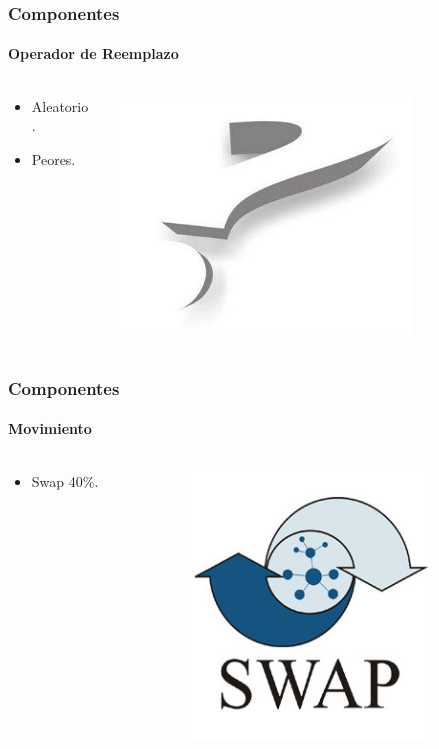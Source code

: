 \frame
{
\frametitle{Componentes}
\framesubtitle{Operador de Reemplazo}
\begin{columns}
	\begin{column}{0.5\textwidth}
		\begin{itemize}
			\item Aleatorio.
			\item Peores.
		\end{itemize}
	\end{column}
	\begin{column}{0.5\textwidth}
		\includegraphics[width=0.75\textwidth]{img/pregunta}
	\end{column}
\end{columns}
}


\frame
{
\frametitle{Componentes}
\framesubtitle{Movimiento}
\begin{columns}
	\begin{column}{0.5\textwidth}
		\begin{itemize}
			\item Swap 40\%.
		\end{itemize}
	\end{column}
	\begin{column}{0.5\textwidth}
		\includegraphics[width=0.75\textwidth]{img/swap}
	\end{column}
\end{columns}
}

